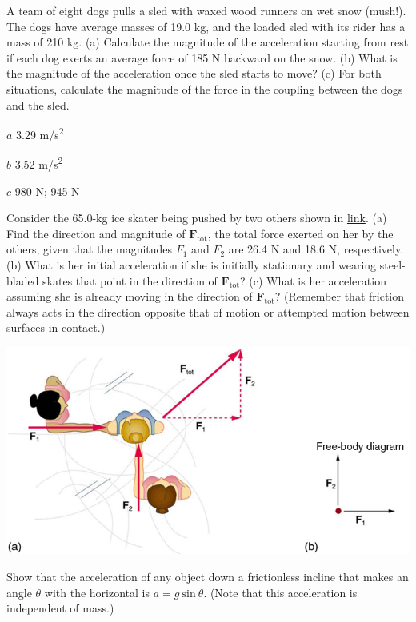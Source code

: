 \documentclass[
]{book}
\newenvironment{problems-exercises}{}{}
\begin{document}
\begin{problems-exercises}
\hypertarget{fs-id1294370}{}
\leavevmode\hypertarget{fs-id1792256}{}%
A team of eight dogs pulls a sled with waxed wood runners on wet snow
(mush!). The dogs have average masses of 19.0 kg, and the loaded sled
with its rider has a mass of 210 kg. (a) Calculate the magnitude of the
acceleration starting from rest if each dog exerts an average force of
185 N backward on the snow. (b) What is the magnitude of the
acceleration once the sled starts to move? (c) For both situations,
calculate the magnitude of the force in the coupling between the dogs
and the sled.

\leavevmode\hypertarget{fs-id1279708}{}%
\(a\) 3.29 m/s\textsuperscript{2}

\(b\) 3.52 m/s\textsuperscript{2}

\(c\) 980 N; 945 N

\hypertarget{fs-id1452889}{}
\leavevmode\hypertarget{fs-id1282329}{}%
Consider the 65.0-kg ice skater being pushed by two others shown in
\protect\hyperlink{eip-id1992243}{link}. (a) Find the direction
and magnitude of \(\mathbf{F}_{\text{tot}}{}\), the total force exerted on
her by the others, given that the magnitudes \(F_{1}{}\) and \(F_{2}{}\) are
26.4 N and 18.6 N, respectively. (b) What is her initial acceleration if
she is initially stationary and wearing steel-bladed skates that point
in the direction of \(\mathbf{F}_{\text{tot}}{}\)? (c) What is her
acceleration assuming she is already moving in the direction of
\(\mathbf{F}_{\text{tot}}{}\)? (Remember that friction always acts in the
direction opposite that of motion or attempted motion between surfaces
in contact.)

\includegraphics{images/Figure 04_01_01a.jpg}

\hypertarget{fs-id1426454}{}
\leavevmode\hypertarget{fs-id1426455}{}%
Show that the acceleration of any object down a frictionless incline
that makes an angle \(\theta{}\) with the horizontal is
\({{a = g}\ \text{sin}\ \theta}{}\). (Note that this acceleration is
independent of mass.)


\end{problems-exercises}
\end{document}
